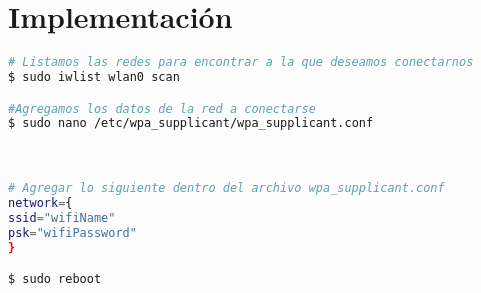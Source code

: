 \chapter{Implementación}

\begin{lstlisting}[language=bash, caption= Configuración de red del RPi]
# Listamos las redes para encontrar a la que deseamos conectarnos
$ sudo iwlist wlan0 scan

#Agregamos los datos de la red a conectarse
$ sudo nano /etc/wpa_supplicant/wpa_supplicant.conf



# Agregar lo siguiente dentro del archivo wpa_supplicant.conf
network={
ssid="wifiName"
psk="wifiPassword"
}

$ sudo reboot	
\end{lstlisting}